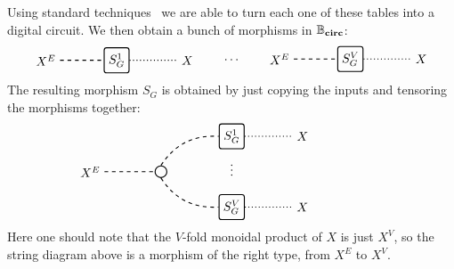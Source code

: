 %
Using standard techniques~\cite{Vollmer1999} we are able to turn each one of 
these tables into a digital circuit. We then obtain a bunch 
of morphisms in $\mathbb{B}_\textbf{circ}$:
%
%
\begin{equation*}
  \begin{tikzpicture}[baseline=0pt]
    \node[draw, minimum height=20, minimum width=20, rounded corners=2, thick] (S) at (0,0) {$S_G^1$};

    \node (Xe) at (-2,0) {$X^E$};
    \node (Xv) at (2,0) {$X$};

    \draw[-, dashed,thick] (Xe) to (S.west);
    \draw[-, dotted, thick] (S.east) to (Xv);
  \end{tikzpicture}
  \qquad \dots \qquad
  \begin{tikzpicture}[baseline=-1pt]
    \node[draw, minimum height=20, minimum width=20, rounded corners=2, thick] (S) at (0,0) {$S_G^V$};

    \node (Xe) at (-2,0) {$X^E$};
    \node (Xv) at (2,0) {$X$};

    \draw[-, dashed, thick] (Xe) to (S.west);
    \draw[-, dotted, thick] (S.east) to (Xv);
  \end{tikzpicture}
\end{equation*}
% 
The resulting morphism $S_G$ is obtained by just copying the 
inputs and tensoring the morphisms together:
%
%
\begin{equation*}
  \begin{tikzpicture}
    \node at (4.25,0) {};
    \node[draw, minimum height=20, minimum width=20, rounded corners=2, thick] (SV) at (0,-1) {$S_G^V$};
    \node[thick] (Sdots) at (0,0.15)  {$\vdots$};
    \node[draw, minimum height=20, minimum width=20, rounded corners=2, thick] (S1) at (0,1)  {$S_G^1$};
    \node[draw, circle, radius=5pt, thick] (copy) at (-2,0) {};

    \node (XeV) at (-4,0) {$X^E$};

    \node (XvV) at (2,-1) {$X$};
    \node (Xv1) at (2,1) {$X$};

    \draw[-, dashed, thick] (XeV) to (copy.west);
    \draw[bend left, dashed, thick] (copy.north) to (S1.west);
    \draw[bend right, dashed, thick] (copy.south) to (SV.west);

    \draw[-, dotted, thick] (SV.east) to (XvV);
    \draw[-, dotted, thick] (S1.east) to (Xv1);
  \end{tikzpicture}
\end{equation*}
%
Here one should note that the $V$-fold monoidal product of $X$ is 
just $X^V$, so the string diagram above is a morphism of the right type, from 
$X^E$ to $X^V$.

